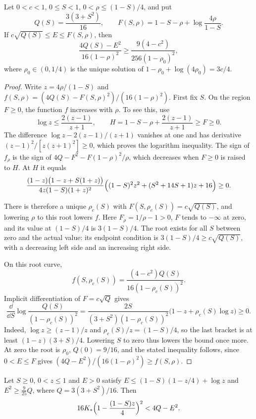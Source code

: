 \begin{lemma}\label{lem:m1-symmetric}
Let $0<c<1$, $0\le S<1$, $0<\rho\le(1-S)/4$, and put
\[
 Q(S)=\frac{3(3+S^2)}{16},\qquad
 F(S,\rho)=1-S-\rho+\log\frac{4\rho}{1-S}.
\]
If $c\sqrt{Q(S)}\le E\le F(S,\rho)$, then
\[
 \frac{4Q(S)-E^2}{16(1-\rho)^2}
 \ge\frac{9(4-c^2)}{256(1-\rho_0)^2},
\]
where $\rho_0\in(0,1/4)$ is the unique solution of
$1-\rho_0+\log(4\rho_0)=3c/4$.
\end{lemma}

\begin{proof}
Write $z=4\rho/(1-S)$ and
$f(S,\rho)=(4Q(S)-F(S,\rho)^2)/(16(1-\rho)^2)$. First fix $S$.
On the region $F\ge0$, the function $f$ increases with $\rho$. To see this, use
\[
 \log z\le\frac{2(z-1)}{z+1},\qquad
 H=1-S-\rho+\frac{2(z-1)}{z+1}\ge F\ge0.
\]
The difference $\log z-2(z-1)/(z+1)$ vanishes at one and has derivative
$(z-1)^2/[z(z+1)^2]\ge0$, which proves the logarithm inequality. The sign of $f_\rho$ is the sign of
$4Q-F^2-F(1-\rho)^2/\rho$, which decreases when $F\ge0$ is raised to $H$. At $H$ it equals
\[
 \frac{(1-z)\bigl(1-z+S(1+z)\bigr)}{4z(1-S)(1+z)^2}
 \Bigl((1-S)^2z^2+(S^2+14S+1)z+16\Bigr)\ge0.
\]

There is therefore a unique $\rho_c(S)$ with $F(S,\rho_c(S))=c\sqrt{Q(S)}$, and lowering
$\rho$ to this root lowers $f$. Here $F_\rho=1/\rho-1>0$, $F$ tends to $-\infty$ at zero,
and its value at $(1-S)/4$ is $3(1-S)/4$. The root exists for all $S$ between zero and the
actual value: its endpoint condition is $3(1-S)/4\ge c\sqrt{Q(S)}$, with a decreasing left
side and an increasing right side.

On this root curve,
\[
 f(S,\rho_c(S))=\frac{(4-c^2)Q(S)}{16(1-\rho_c(S))^2}.
\]
Implicit differentiation of $F=c\sqrt Q$ gives
\[
 \frac{\dd}{\dd S}\log\frac{Q(S)}{(1-\rho_c(S))^2}
 =\frac{2S}{(3+S^2)(1-\rho_c(S))^2}
       \bigl(1-z+\rho_c(S)\log z\bigr)\ge0.
\]
Indeed, $\log z\ge(z-1)/z$ and $\rho_c(S)/z=(1-S)/4$, so the last bracket is at least
$(1-z)(3+S)/4$. Lowering $S$ to zero thus lowers the bound once more. At zero the root is
$\rho_0$, $Q(0)=9/16$, and the stated inequality follows, since $0<E\le F$ gives
$(4Q-E^2)/(16(1-\rho)^2)\ge f(S,\rho)$.
\end{proof}

\begin{lemma}\label{lem:m1-core}
Let $S\ge0$, $0<z\le1$ and $E>0$ satisfy
$E\le(1-S)(1-z/4)+\log z$ and $E^2\ge\frac9{25}Q$, where $Q=3(3+S^2)/16$. Then
\[
 16K_*\Bigl(1-\frac{(1-S)z}4\Bigr)^2<4Q-E^2.
\]
\end{lemma}

